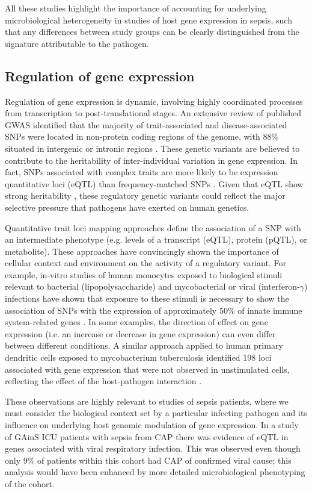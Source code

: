 All these studies highlight the importance of accounting for underlying microbiological heterogeneity in studies of host gene expression in sepsis, such that any differences between study groups can be clearly distinguished from the signature attributable to the pathogen. 

\subsection{Regulation of gene expression}
Regulation of gene expression is dynamic, involving highly coordinated processes from transcription to post-translational stages. An extensive review of published GWAS identified that the majority of trait-associated and disease-associated SNPs were located in non-protein coding regions of the genome, with 88\% situated in intergenic or intronic regions \parencite{Hindorff2009}. These genetic variants are believed to contribute to the heritability of inter-individual variation in gene expression. In fact, SNPs associated with complex traits are more likely to be expression quantitative loci (eQTL) than frequency-matched SNPs \parencite{Nicolae2010}. Given that eQTL show strong heritability \parencite{Wright2014}, these regulatory genetic variants could reflect the major selective pressure that pathogens have exerted on human genetics. 

Quantitative trait loci mapping approaches define the association of a SNP with an intermediate phenotype (e.g. levels of a transcript (eQTL), protein (pQTL), or metabolite). These approaches have convincingly shown the importance of cellular context and environment on the activity of a regulatory variant. For example, in-vitro studies of human monocytes exposed to biological stimuli relevant to bacterial (lipopolysaccharide) and mycobacterial or viral (interferon-$\gamma$) infections have shown that exposure to these stimuli is necessary to show the association of SNPs with the expression of approximately 50\% of innate immune system-related genes \parencite{Fairfax2014}. In some examples, the direction of effect on gene expression (i.e. an increase or decrease in gene expression) can even differ between different conditions. A similar approach applied to human primary dendritic cells exposed to mycobacterium tuberculosis identified 198 loci associated with gene expression that were not observed in unstimulated cells, reflecting the effect of the host-pathogen interaction \parencite{Barreiro2012}. 

These observations are highly relevant to studies of sepsis patients, where we must consider the biological context set by a particular infecting pathogen and its influence on underlying host genomic modulation of gene expression. In a study of GAinS ICU patients with sepsis from CAP \parencite{Davenport2016} there was evidence of eQTL in genes associated with viral respiratory infection. This was observed even though only 9\% of patients within this cohort had CAP of confirmed viral cause; this analysis would have been enhanced by more detailed microbiological phenotyping of the cohort. 

